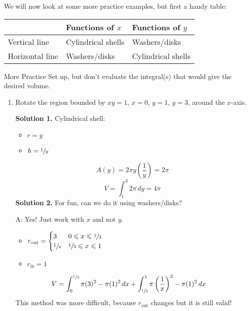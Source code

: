 We will now look at some more practice examples, but first a handy table:

\begin{table}[H]
    \centering
    \begin{tabularx}{0.7\linewidth}{@{}YYY@{}}
                        & Functions of $ x $ & Functions of $ y $ \\
        \midrule
        Vertical line   & Cylindrical shells & Washers/disks      \\
        Horizontal line & Washers/disks      & Cylindrical shells
    \end{tabularx}
\end{table}

\begin{Example}{More Practice}{}
    Set up, but don't evaluate the integral(s) that would give
    the desired volume.

    \begin{enumerate}[label=(\roman*)]
        \item Rotate the region bounded by $ xy=1 $, $ x=0 $, $ y=1 $, $ y=3 $,
              around the $ x $-axis.

              \textbf{Solution 1.} Cylindrical shell:
              \begin{itemize}
                  \item $ r=y $
                  \item $ h=\sfrac{1}{y} $
              \end{itemize}
              \[ A(y)=2\pi y\left( \frac{1}{y}  \right)=2\pi \]
              \[ V=\int_{1}^{3} 2\pi\, d{y}=4\pi \]
              \textbf{Solution 2.} For fun, can we do it using washers/disks?

              A\@: Yes! Just work with $ x $ and not $ y $.
              \begin{itemize}
                  \item $ \displaystyle  r_{\text{out}}=\begin{cases}
                                3            & 0\leqslant x\leqslant \sfrac{1}{3}   \\
                                \sfrac{1}{x} & \sfrac{1}{3} \leqslant x \leqslant 1
                            \end{cases} $
                  \item $ r_{\text{in}}=1 $
              \end{itemize}
              \begin{align*}
                  V
                   & =\int_{0}^{\sfrac{1}{3}} \pi(3)^2-\pi(1)^2\, d{x}
                  +\int_{\sfrac{1}{3}}^{1} \pi\left( \frac{1}{x} \right)^2-\pi(1)^2\, d{x}
              \end{align*}
              This method was more difficult, because $ r_{\text{out}} $ changes but it is still valid!


\end{enumerate}
\end{Example}
